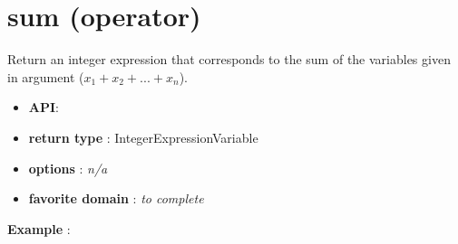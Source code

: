 \label{sum}
\hypertarget{sum}{}

\section{sum (operator)}\label{sum:sumoperator}\hypertarget{sum:sumoperator}{}
Return an integer expression that corresponds to the sum of the variables given in argument (\(x_1+x_2+...+x_n\)).

\begin{itemize}
	\item \textbf{API}: 
	\item \textbf{return type} : IntegerExpressionVariable
	\item \textbf{options} : \emph{n/a}
	\item \textbf{favorite domain} : \emph{to complete}
\end{itemize}

\textbf{Example} :

